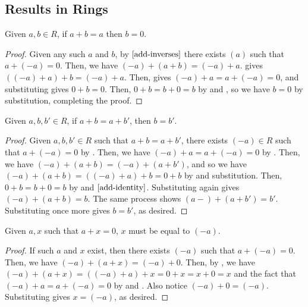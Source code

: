 \subsection{Results in Rings}

\begin{theorem}\label{local-add-identity-is-0}
    Given $a, b \in R$, if $a+b = a$ then $b=0$. 
\end{theorem}
\begin{proof}
    Given any such $a$ and $b$, by $\Cref{add-inverses}$ there exists $(a)$ such that $a + (-a) = 0$. Then, we have $(-a) + (a+b) = (-a) + a$.  gives $( (-a) + a) + b = (-a) + a$. Then,  gives $(-a) + a = a + (-a) = 0$, and substituting gives $0 + b = 0$. Then, $0 + b = b+0 = b$ by  and , so we have $b=0$ by substitution, completing the proof. 
\end{proof}

\begin{theorem}\label{add-left-cancel}
    Given $a, b, b' \in R$, if $a + b = a + b'$, then $b = b'$.
\end{theorem}
\begin{proof}
    Given $a, b, b' \in R$ such that $a+b = a+b'$, there exists $(-a) \in R$ such that $a + (-a) = 0$ by . Then, we have $(-a) + a = a + (-a) = 0$ by . Then, we have $(-a) + (a+b) = (-a) + (a + b')$, and so we have $(-a) + (a+b) = ((-a)+a)+b = 0 + b$ by  and substitution. Then, $0+b = b+0 = b$ by  and $\Cref{add-identity}$. Substituting again gives $(-a) + (a+b) = b$. The same process shows $(a-) + (a+b') = b'$. Substituting once more gives $b = b'$, as desired.  
\end{proof}

\begin{theorem}\label{add-inverse-unique}
    Given $a, x$ such that $a+ x = 0$, $x$ must be equal to $(-a)$. 
\end{theorem}
\begin{proof} If such $a$ and $x$ exist, then there exists $(-a)$ such that $a + (-a) = 0$. Then, we have $(-a) + (a+ x) = (-a) + 0$. Then, by , we have $(-a) + (a+x) = ((-a)+a) + x = 0+x = x+0 = x$ and the fact that $(-a)+a = a + (-a) = 0$ by  and . Also notice $(-a) + 0 = (-a)$. Substituting gives $x = (-a)$, as desired.
\end{proof}

